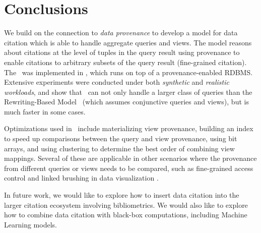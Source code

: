 \section{Conclusions}\label{sec: conclusion}
We build on the connection to {\em data provenance} to develop a model for  data citation which is able to handle aggregate queries and views. The model reasons about citations at the level of tuples in the query result using provenance to enable citations to arbitrary subsets of the query result (fine-grained citation).  The \pbafull\ was implemented in \provalg, which runs on top of a provenance-enabled RDBMS.  Extensive experiments were conducted under both {\em synthetic} and {\em realistic workloads}, and show that \provalg\ can not only handle a {larger class of queries} than the Rewriting-Based Model~\cite{wu2018data} (which assumes conjunctive queries and views), but is much faster in some cases.   

Optimizations used in \provalg\ include materializing view provenance, 
building an index %
to speed up comparisons between the query and view provenance, using bit arrays, and using clustering to determine the best order of combining view mappings.
Several of these are applicable in other scenarios where the provenance from different queries or views needs to be compared, such as fine-grained access control \cite{goyal2006attribute} and linked brushing in data visualization \cite{psallidas2018smoke}.

In future work, we would like to explore how to insert data citation into the larger citation ecosystem involving bibliometrics. We would also like to explore how to combine data citation with black-box computations, including Machine Learning models. 

